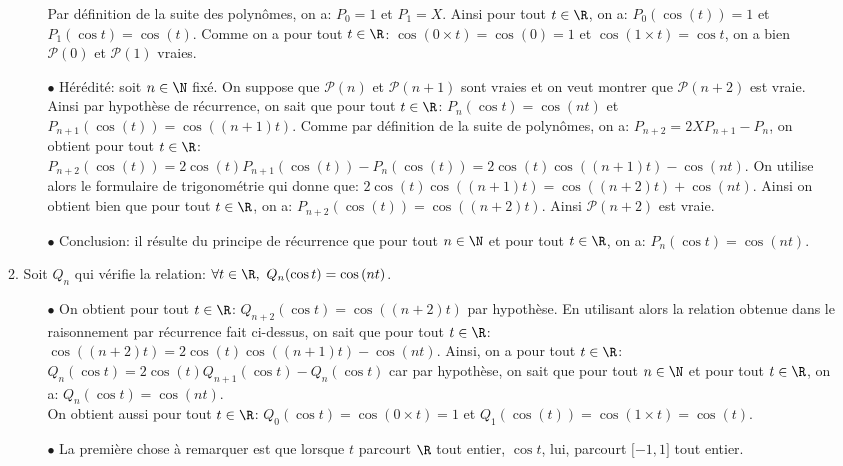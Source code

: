 \documentclass[a4paper, 11pt,reqno]{article}
\begin{document}
\begin{correction}
\begin{enumerate}
\begin{enumerate}
\begin{itemize}
				                  \noindent Par d\'efinition de la suite des polyn\^{o}mes, on a: $P_0=1$ et $P_1=X$. Ainsi pour tout $t\in\R$, on a: $P_0(\cos{(t)})=1$ et $P_1(\cos{t})=\cos{(t)}$. Comme on a pour tout $t\in\R$: $\cos{(0\times t)}=\cos{(0)}=1$ et $\cos{(1\times t)}=\cos{t}$, on a bien $\mathcal{P}(0)$ et $\mathcal{P}(1)$ vraies.
				            \item[$\bullet$] H\'er\'edit\'e: soit $n\in\N$ fix\'e. On suppose que $\mathcal{P}(n)$ et $\mathcal{P}(n+1)$ sont vraies et on veut montrer que $\mathcal{P}(n+2)$ est vraie. Ainsi par hypoth\`{e}se de r\'ecurrence, on sait que pour tout $t\in\R$: $P_n(\cos{t})=\cos{(nt)}$ et $P_{n+1}(\cos{(t)})=\cos{((n+1)t)}$. Comme par d\'efinition de la suite de polyn\^{o}mes, on a: $P_{n+2}=2XP_{n+1}-P_n$, on obtient pour tout $t\in\R$:
				                  $P_{n+2}(\cos{(t)})=2\cos{(t)}P_{n+1}(\cos{(t)})-P_n(\cos{(t)})=2\cos{(t)}\cos{((n+1)t)}-\cos{(nt)}$. On utilise alors le formulaire de trigonom\'etrie qui donne que: $2\cos{(t)}\cos{((n+1)t)}=\cos{((n+2)t)}+\cos{(nt)}$. Ainsi on obtient bien que pour tout $t\in\R$, on a: $P_{n+2}(\cos{(t)})=\cos{((n+2)t)}$. Ainsi $\mathcal{P}(n+2)$ est vraie.
				            \item[$\bullet$] Conclusion: il r\'esulte du principe de r\'ecurrence que pour tout $n\in\N$ et pour tout $t\in\R$, on a: $P_n(\cos{t})=\cos{(nt)}$.
			            \end{itemize}
			      \item
			            Soit $Q_n$ qui v\'erifie la relation: $\forall t\in\R,\ Q_n(\cos{t})=\cos{(nt)}$.
			            \begin{itemize}
				            \item[$\bullet$] On obtient pour tout $t\in\R$:
				                  $Q_{n+2}(\cos{t})=\cos{((n+2)t)}$ par hypoth\`{e}se. En utilisant alors la relation obtenue dans le raisonnement par r\'ecurrence fait ci-dessus, on sait que pour tout $t\in\R$: $\cos{((n+2)t)}=2\cos{(t)}\cos{((n+1)t)}-\cos{(nt)}$. Ainsi, on a pour tout $t\in\R$: $Q_n(\cos{t})=2\cos{(t)}Q_{n+1}(\cos{t})-Q_n(\cos{t})$ car par hypoth\`{e}se, on sait que pour tout $n\in\N$ et pour tout $t\in\R$, on a: $Q_n(\cos{t})=\cos{(nt)}$.\\
				                  \noindent On obtient aussi pour tout $t\in\R$: $Q_0(\cos{t})=\cos{(0\times t)}=1$ et $Q_1(\cos{(t)})=\cos{(1\times t)}=\cos{(t)}$.
				            \item[$\bullet$] La premi\`{e}re chose \`{a} remarquer est que lorsque $t$ parcourt $\R$ tout entier, $\cos{t}$, lui, parcourt $\lbrack -1,1\rbrack$ tout entier.

\end{itemize}
\end{enumerate}
\end{enumerate}
\end{correction}
\end{document}
